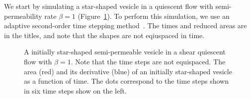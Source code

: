 \documentclass[aps,prl,showpacs]{revtex4}
\newif\ifTikz
\begin{document}
We start by simulating a star-shaped vesicle in a quiescent flow with
semi-permeability rate $\beta=1$ (Figure~\ref{fig:starShape}). To
perform this simulation, we use an adaptive second-order time stepping
method~\cite{qua-bir2016}. The times and reduced areas are in the
titles, and note that the shapes are not eqiuspaced in time.
\begin{figure}[htp]
  \begin{minipage}{0.55\textwidth}
    
    
    
    
    
    
  \end{minipage}
  \hfill
  \begin{minipage}{0.4\textwidth}
  
  \end{minipage}
  \caption{\label{fig:starShape} A initially star-shaped semi-permeable
  vesicle in a shear quiescent flow with $\beta=1$. Note that the time
  steps are not equispaced. The area (red) and its derivative (blue) of
  an initially star-shaped vesicle as a function of time. The dots
  correspond to the time steps shown in six time steps
  show on the left.}
\end{figure}
\end{document}
